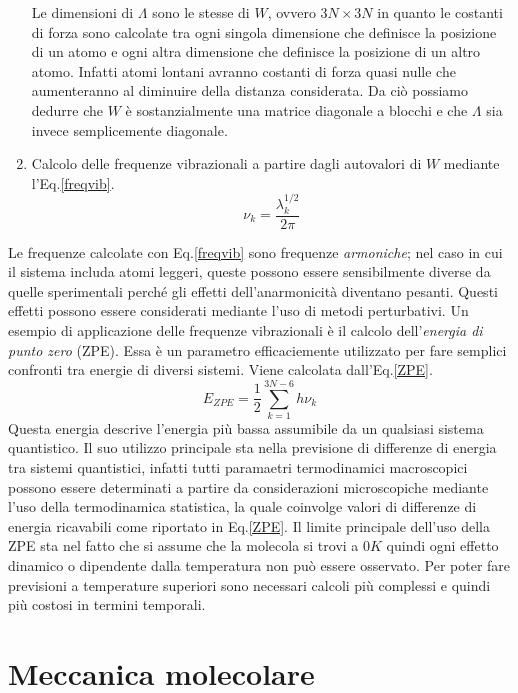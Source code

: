 \documentclass[oneside]{amsbook}
\numberwithin{section}{chapter}
\numberwithin{equation}{section}
\numberwithin{figure}{section}
\begin{document}
\begin{enumerate}
Le dimensioni di $\Lambda$ sono le stesse di $W$, ovvero $3N\times3N$ in quanto le costanti di forza sono calcolate tra ogni singola dimensione che definisce la posizione di un atomo e ogni altra dimensione che definisce la posizione di un altro atomo. Infatti atomi lontani avranno costanti di forza quasi nulle che aumenteranno al diminuire della distanza considerata. Da ciò possiamo dedurre che $W$ è sostanzialmente una matrice diagonale a blocchi e che $\Lambda$ sia invece semplicemente diagonale.
\item Calcolo delle frequenze vibrazionali a partire dagli autovalori di $W$ mediante l'Eq.\ref{freqvib}.
\begin{equation}
\label{freqvib}
\nu_k= \frac{\lambda_k^{1/2}}{2 \pi}
\end{equation}
\end{enumerate}
Le frequenze calcolate con Eq.\ref{freqvib} sono frequenze \emph{armoniche}; nel caso in cui il sistema includa atomi leggeri, queste possono essere sensibilmente diverse da quelle sperimentali perché gli effetti dell'anarmonicità diventano pesanti. Questi effetti possono essere considerati mediante l'uso di metodi perturbativi. 
Un esempio di applicazione delle frequenze vibrazionali è il calcolo dell'\emph{energia di punto zero} (ZPE). Essa è un parametro efficaciemente utilizzato per fare semplici confronti tra energie di diversi sistemi. Viene calcolata dall'Eq.\ref{ZPE}.
\begin{equation}
\label{ZPE}
E_{ZPE}=\frac{1}{2} \sum \limits_{k=1}^{3N-6}h\nu_k
\end{equation}
Questa energia descrive l'energia più bassa assumibile da un qualsiasi sistema quantistico. Il suo utilizzo principale sta nella previsione di differenze di energia tra sistemi quantistici, infatti tutti paramaetri termodinamici macroscopici possono essere determinati a partire da considerazioni microscopiche mediante l'uso della termodinamica statistica, la quale coinvolge valori di differenze di energia ricavabili come riportato in Eq.\ref{ZPE}. Il limite principale dell'uso della ZPE sta nel fatto che si assume che la molecola si trovi a $0 K$ quindi ogni effetto dinamico o dipendente dalla temperatura non può essere osservato. Per poter fare previsioni a temperature superiori sono necessari calcoli più complessi e quindi più costosi in termini temporali.





\part{Meccanica molecolare}
\end{document}
